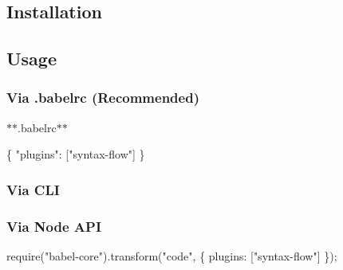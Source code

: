 \subsection*{Installation}




\subsection*{Usage}

\subsubsection*{Via {\ttfamily .babelrc} (Recommended)}

$\ast$$\ast$.babelrc$\ast$$\ast$


\begin{DoxyCode}
\{
  "plugins": ["syntax-flow"]
\}
\end{DoxyCode}


\subsubsection*{Via C\+LI}




\subsubsection*{Via Node A\+PI}


\begin{DoxyCode}
require("babel-core").transform("code", \{
  plugins: ["syntax-flow"]
\});
\end{DoxyCode}
 
